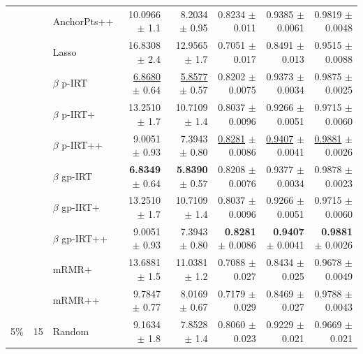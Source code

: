 \begin{longtable}{llp{}rrrrr}
 &  & AnchorPts++ & 10.0966 {\scriptsize $\pm$ 1.1} & 8.2034 {\scriptsize $\pm$ 0.95} & 0.8234 {\scriptsize $\pm$ 0.011} & 0.9385 {\scriptsize $\pm$ 0.0061} & 0.9819 {\scriptsize $\pm$ 0.0048} \\
 &  & Lasso & 16.8308 {\scriptsize $\pm$ 2.4} & 12.9565 {\scriptsize $\pm$ 1.7} & 0.7051 {\scriptsize $\pm$ 0.017} & 0.8491 {\scriptsize $\pm$ 0.013} & 0.9515 {\scriptsize $\pm$ 0.0088} \\
 &  & $\beta$ p-IRT & \underline{6.8680} {\scriptsize $\pm$ 0.64} & \underline{5.8577} {\scriptsize $\pm$ 0.57} & 0.8202 {\scriptsize $\pm$ 0.0075} & 0.9373 {\scriptsize $\pm$ 0.0034} & 0.9875 {\scriptsize $\pm$ 0.0025} \\
 &  & $\beta$ p-IRT+ & 13.2510 {\scriptsize $\pm$ 1.7} & 10.7109 {\scriptsize $\pm$ 1.4} & 0.8037 {\scriptsize $\pm$ 0.0096} & 0.9266 {\scriptsize $\pm$ 0.0051} & 0.9715 {\scriptsize $\pm$ 0.0060} \\
 &  & $\beta$ p-IRT++ & 9.0051 {\scriptsize $\pm$ 0.93} & 7.3943 {\scriptsize $\pm$ 0.80} & \underline{0.8281} {\scriptsize $\pm$ 0.0086} & \underline{0.9407} {\scriptsize $\pm$ 0.0041} & \underline{0.9881} {\scriptsize $\pm$ 0.0026} \\
 &  & $\beta$ gp-IRT & \textbf{6.8349} {\scriptsize $\pm$ 0.64} & \textbf{5.8390} {\scriptsize $\pm$ 0.57} & 0.8208 {\scriptsize $\pm$ 0.0076} & 0.9377 {\scriptsize $\pm$ 0.0034} & 0.9878 {\scriptsize $\pm$ 0.0023} \\
 &  & $\beta$ gp-IRT+ & 13.2510 {\scriptsize $\pm$ 1.7} & 10.7109 {\scriptsize $\pm$ 1.4} & 0.8037 {\scriptsize $\pm$ 0.0096} & 0.9266 {\scriptsize $\pm$ 0.0051} & 0.9715 {\scriptsize $\pm$ 0.0060} \\
 &  & $\beta$ gp-IRT++ & 9.0051 {\scriptsize $\pm$ 0.93} & 7.3943 {\scriptsize $\pm$ 0.80} & \textbf{0.8281} {\scriptsize $\pm$ 0.0086} & \textbf{0.9407} {\scriptsize $\pm$ 0.0041} & \textbf{0.9881} {\scriptsize $\pm$ 0.0026} \\
 &  & mRMR+ & 13.6881 {\scriptsize $\pm$ 1.5} & 11.0381 {\scriptsize $\pm$ 1.2} & 0.7088 {\scriptsize $\pm$ 0.027} & 0.8434 {\scriptsize $\pm$ 0.025} & 0.9678 {\scriptsize $\pm$ 0.0049} \\
 &  & mRMR++ & 9.7847 {\scriptsize $\pm$ 0.77} & 8.0169 {\scriptsize $\pm$ 0.67} & 0.7179 {\scriptsize $\pm$ 0.029} & 0.8469 {\scriptsize $\pm$ 0.027} & 0.9788 {\scriptsize $\pm$ 0.0043} \\
\midrule
5\% & 15 & Random & 9.1634 {\scriptsize $\pm$ 1.8} & 7.8528 {\scriptsize $\pm$ 1.4} & 0.8060 {\scriptsize $\pm$ 0.023} & 0.9229 {\scriptsize $\pm$ 0.021} & 0.9669 {\scriptsize $\pm$ 0.021} \\

\end{longtable}
